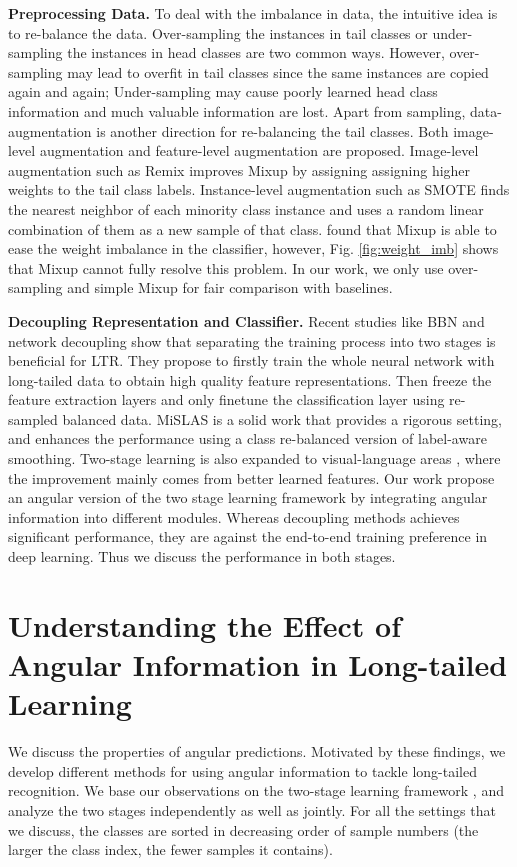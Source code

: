 \documentclass[10pt,twocolumn,letterpaper]{article}
\begin{document}
\textbf{Preprocessing Data.}
To deal with the imbalance in data, the intuitive idea is to re-balance the data. Over-sampling \cite{learning-imb, oversample1, oversample2} the instances in tail classes or under-sampling \cite{undersample1, undersample2} the instances in head classes are two common ways. However, over-sampling may lead to overfit in tail classes since the same instances are copied again and again; Under-sampling may cause poorly learned head class information and much valuable information are lost. Apart from sampling, data-augmentation is another direction for re-balancing the tail classes. Both image-level augmentation and feature-level augmentation are proposed. Image-level augmentation such as Remix \cite{remix} improves Mixup \cite{mixup} by assigning assigning higher weights to the tail class labels. Instance-level augmentation such as SMOTE \cite{smote} finds the nearest neighbor of each minority class instance and uses a random linear combination of them as a new sample of that class. \cite{mislas} found that Mixup is able to ease the weight imbalance in the classifier, however, Fig. \ref{fig:weight_imb} shows that Mixup cannot fully resolve this problem. In our work, we only use over-sampling and simple Mixup for fair comparison with baselines.

\textbf{Decoupling Representation and Classifier.}
Recent studies like BBN \cite{bbn} and network decoupling \cite{decoupling} show that separating the training process into two stages is beneficial for LTR. They propose to firstly train the whole neural network with long-tailed data to obtain high quality feature representations. Then freeze the feature extraction layers and only finetune the classification layer using re-sampled balanced data. MiSLAS \cite{mislas} is a solid work that provides a rigorous setting, and enhances the performance using a class re-balanced version of label-aware smoothing. Two-stage learning is also expanded to visual-language areas \cite{vl-ltr}, where the improvement mainly comes from better learned features. Our work propose an angular version of the two stage learning framework \cite{mislas} by integrating angular information into different modules. Whereas decoupling methods achieves significant performance, they are against the end-to-end training preference in deep learning. Thus we discuss the performance in both stages.
 



\section{Understanding the Effect of Angular Information in Long-tailed Learning}
We discuss the properties of angular predictions. Motivated by these findings, we develop different methods for using angular information to tackle long-tailed recognition. We base our observations on the two-stage learning framework \cite{mislas}, and analyze the two stages independently as well as jointly. For all the settings that we discuss, the classes are sorted in decreasing order of sample numbers (the larger the class index, the fewer samples it contains). 
\end{document}
